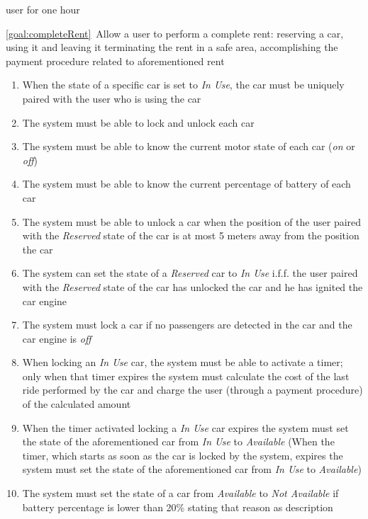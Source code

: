 \begin{description}
\begin{enumerate}[resume*]
  				user for one hour
   			\end{enumerate}
  		\item \ref{goal:completeRent}\ Allow a user to perform a complete rent: reserving a car, using it and leaving it terminating the rent in a safe area, accomplishing the payment procedure related to aforementioned rent
  			\begin{enumerate}[resume*]
  			 	\item When the state of a specific car is set to \emph{In Use}, the car must be
 	  			uniquely paired with the user who is using the car
  				\item The system must be able to lock and unlock each car
  				\item The system must be able to know the current motor state of each car
  				(\emph{on} or \emph{off})
  				\item The system must be able to know the current percentage of battery of each car
  				\item The system must be able to unlock a car when the position of the user paired with the
  				\emph{Reserved} state of the car is at most 5 meters away from the position the car
  				\item The system can set the state of a \emph{Reserved} car to \emph{In Use} i.f.f.
  				the user paired with the \emph{Reserved} state of the car has unlocked the car and he
  				has ignited the car engine
  				\item The system must lock a car if no passengers are detected in the car and the car
  				engine is \emph{off}
  				\item When locking  an \emph{In Use} car, the system must be able to activate a timer;
  				only when that timer expires the system must calculate the cost of the last ride
  				performed by the car and charge the user (through a payment procedure) of the calculated
  				amount
  				\item When the timer activated locking a \emph{In Use} car expires the system must
  				set the state of the aforementioned car from \emph{In Use} to \emph{Available}
  				(When the timer, which starts as soon as the car is locked by the system, expires the
  				system must set the state of the aforementioned car from \emph{In Use} to
  				\emph{Available})
  				\item The system must set the state of a car from \emph{Available}
  				to \emph{Not Available} if battery percentage is lower than 20\%  stating that reason
  				as description

\end{enumerate}
\end{description}

